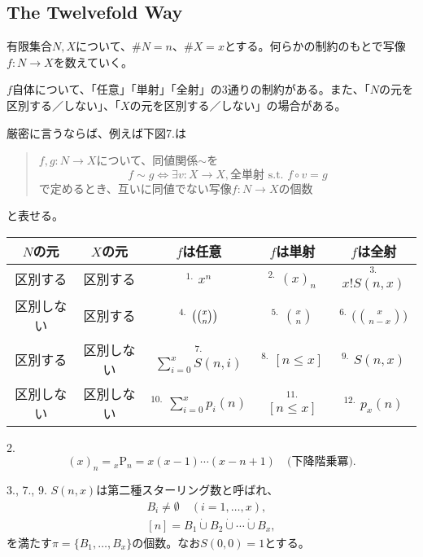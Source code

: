 \documentclass[xelatex,ja=standard,a4paper,14pt,everyparhook=compat]{bxjsarticle}
\newcommand{\bbinom}[2]{\mleft(\binom{#1}{#2}\mright)}
\newcommand{\bool}[1]{[#1]}
\newcommand{\dcup}{\mathbin{\dot\cup}}
\theoremstyle{definition}
\begin{document}
\setcounter{section}{1}
\setcounter{subsection}{8}
\subsection{The Twelvefold Way}

有限集合$N,X$について、$\#N = n$、$\#X = x$とする。何らかの制約のもとで写像$f:N \to X$を数えていく。

$f$自体について、「任意」「単射」「全射」の$3$通りの制約がある。また、「$N$の元を区別する／しない」、「$X$の元を区別する／しない」の場合がある。

厳密に言うならば、例えば下図7.は
\begin{quote}
    $f,g : N \to X$について、同値関係$\sim$を \begin{equation*}
        f \sim g \Longleftrightarrow \text{$\exists v: X \to X,\text{全単射}$ s.t. $f \circ v = g$}
    \end{equation*}
    で定めるとき、互いに同値でない写像$f:N \to X$の個数
\end{quote}
と表せる。

\begin{table}[ht]
    \centering
    \begin{tabular}{ccccc}
        $N$の元    & $X$の元    & $f$は任意                        & $f$は単射                    & $f$は全射                            \\
        \hline
        区別する   & 区別する   & ${}^{1.}$ $x^n$                  & ${}^{2.}$ $(x)_n$            & ${}^{3.}$ $x! S(n,x)$                \\
        区別しない & 区別する   & ${}^{4.}$ $\bbinom{x}{n}$        & ${}^{5.}$ $\binom{x}{n}$     & ${}^{6.}$ $\big(\binom{x}{n-x}\big)$ \\
        区別する   & 区別しない & ${}^{7.}$ $\sum_{i=0}^x S(n,i)$  & ${}^{8.}$ $\bool{n \leq x}$  & ${}^{9.}$ $S(n,x)$                   \\
        区別しない & 区別しない & ${}^{10.}$ $\sum_{i=0}^x p_i(n)$ & ${}^{11.}$ $\bool{n \leq x}$ & ${}^{12.}$ $p_x(n)$
    \end{tabular}
\end{table}

2. \begin{equation*}
    (x)_n = {}_x \mathrm{P}_n = x(x-1)\cdots(x-n+1) \quad \text{(下降階乗冪)}.
\end{equation*}

3., 7., 9. $S(n,x)$は第二種スターリング数と呼ばれ、 \begin{gather*}
    B_i \neq \emptyset \quad (i = 1,\ldots,x), \\
    [n] = B_1 \dcup B_2 \dcup \cdots \dcup B_x,
\end{gather*}
を満たす$\pi = \{B_1,\ldots,B_x\}$の個数。なお$S(0,0) = 1$とする。
\end{document}
